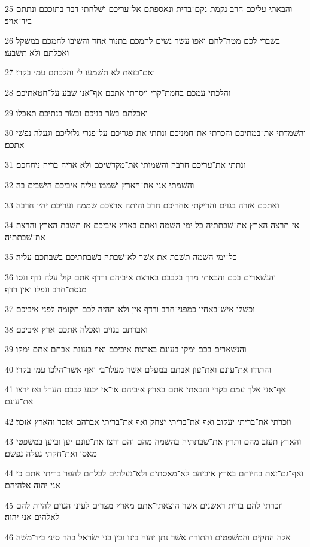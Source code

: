 \par 25 והבאתי עליכם חרב נקמת נקם־ברית ונאספתם אל־עריכם ושׁלחתי דבר בתוככם ונתתם ביד־אויב׃
\par 26 בשׁברי לכם מטה־לחם ואפו עשׂר נשׁים לחמכם בתנור אחד והשׁיבו לחמכם במשׁקל ואכלתם ולא תשׂבעו׃
\par 27 ואם־בזאת לא תשׁמעו לי והלכתם עמי בקרי׃
\par 28 והלכתי עמכם בחמת־קרי ויסרתי אתכם אף־אני שׁבע על־חטאתיכם׃
\par 29 ואכלתם בשׂר בניכם ובשׂר בנתיכם תאכלו׃
\par 30 והשׁמדתי את־במתיכם והכרתי את־חמניכם ונתתי את־פגריכם על־פגרי גלוליכם וגעלה נפשׁי אתכם׃
\par 31 ונתתי את־עריכם חרבה והשׁמותי את־מקדשׁיכם ולא אריח בריח ניחחכם׃
\par 32 והשׁמתי אני את־הארץ ושׁממו עליה איביכם הישׁבים בה׃
\par 33 ואתכם אזרה בגוים והריקתי אחריכם חרב והיתה ארצכם שׁממה ועריכם יהיו חרבה׃
\par 34 אז תרצה הארץ את־שׁבתתיה כל ימי השׁמה ואתם בארץ איביכם אז תשׁבת הארץ והרצת את־שׁבתתיה׃
\par 35 כל־ימי השׁמה תשׁבת את אשׁר לא־שׁבתה בשׁבתתיכם בשׁבתכם עליה׃
\par 36 והנשׁארים בכם והבאתי מרך בלבבם בארצת איביהם ורדף אתם קול עלה נדף ונסו מנסת־חרב ונפלו ואין רדף׃
\par 37 וכשׁלו אישׁ־באחיו כמפני־חרב ורדף אין ולא־תהיה לכם תקומה לפני איביכם׃
\par 38 ואבדתם בגוים ואכלה אתכם ארץ איביכם׃
\par 39 והנשׁארים בכם ימקו בעונם בארצת איביכם ואף בעונת אבתם אתם ימקו׃
\par 40 והתודו את־עונם ואת־עון אבתם במעלם אשׁר מעלו־בי ואף אשׁר־הלכו עמי בקרי׃
\par 41 אף־אני אלך עמם בקרי והבאתי אתם בארץ איביהם או־אז יכנע לבבם הערל ואז ירצו את־עונם׃
\par 42 וזכרתי את־בריתי יעקוב ואף את־בריתי יצחק ואף את־בריתי אברהם אזכר והארץ אזכר׃
\par 43 והארץ תעזב מהם ותרץ את־שׁבתתיה בהשׁמה מהם והם ירצו את־עונם יען וביען במשׁפטי מאסו ואת־חקתי געלה נפשׁם׃
\par 44 ואף־גם־זאת בהיותם בארץ איביהם לא־מאסתים ולא־געלתים לכלתם להפר בריתי אתם כי אני יהוה אלהיהם׃
\par 45 וזכרתי להם ברית ראשׁנים אשׁר הוצאתי־אתם מארץ מצרים לעיני הגוים להיות להם לאלהים אני יהוה׃
\par 46 אלה החקים והמשׁפטים והתורת אשׁר נתן יהוה בינו ובין בני ישׂראל בהר סיני ביד־משׁה׃

